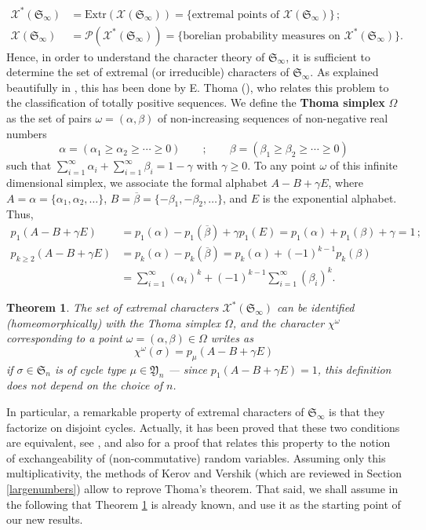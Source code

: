 \documentclass[smallextended,nospthms]{svjour3}
\newtheorem{theorem}{Theorem}
\theoremstyle{remark}
\newcommand{\sym}{\mathfrak{S}}
\newcommand{\ym}{\mathfrak{Y}}
\begin{document}
\begin{align*}\mathcal{X}^{*}(\sym_{\infty})&=\mathrm{Extr}(\mathcal{X}(\sym_{\infty}))=\{\text{extremal points of }\mathcal{X}(\sym_{\infty})\}\,;\\
\mathcal{X}(\sym_{\infty})&=\mathscr{P}(\mathcal{X}^{*}(\sym_{\infty}))=\{\text{borelian probability measures on }\mathcal{X}^{*}(\sym_{\infty})\}.
\end{align*}
Hence, in order to understand the character theory of $\sym_{\infty}$, it is sufficient to determine the set of extremal (or irreducible) characters of $\sym_{\infty}$. As explained beautifully in \cite{KOV04,Oko97}, this has been done by E. Thoma (\cite{Tho64}), who relates this problem to the classification of totally positive sequences. We define the \textbf{Thoma simplex} $\Omega$ as the set of pairs $\omega=(\alpha,\beta)$ of non-increasing sequences of non-negative real numbers
$$\alpha=(\alpha_{1}\geq \alpha_{2}\geq \cdots \geq 0)\qquad;\qquad\beta=(\beta_{1}\geq \beta_{2}\geq \cdots \geq 0)$$
such that $\sum_{i=1}^{\infty}\alpha_{i}+\sum_{i=1}^{\infty}\beta_{i}=1-\gamma$ with $\gamma \geq0$. To any point $\omega$ of this infinite dimensional simplex, we associate the formal alphabet $A-B+\gamma E$, where $A=\alpha=\{\alpha_{1},\alpha_{2},\ldots\}$, $B=\overline{\beta}=\{-\beta_{1},-\beta_{2},\ldots\}$, and $E$ is the exponential alphabet. Thus, 
\begin{align*}
p_{1}(A-B+\gamma E)&=p_{1}(\alpha)-p_{1}(\overline{\beta})+\gamma p_{1}(E)=p_{1}(\alpha)+p_{1}(\beta)+\gamma=1\,;\\
p_{k\geq 2}(A-B+\gamma E)&=p_{k}(\alpha)-p_{k}(\overline{\beta})=p_{k}(\alpha)+(-1)^{k-1}p_{k}(\beta)\\
&=\sum_{i=1}^{\infty}(\alpha_{i})^{k}+(-1)^{k-1}\sum_{i=1}^{\infty}(\beta_{i})^{k}.
\end{align*}
\begin{theorem}\label{thomatheorem}
The set of extremal characters $\mathcal{X}^{*}(\sym_{\infty})$ can be identified (homeomorphically) with the Thoma simplex $\Omega$, and the character $\chi^{\omega}$ corresponding to a point $\omega=(\alpha,\beta) \in \Omega$ writes as
$$\chi^{\omega}(\sigma)=p_{\mu}(A-B+\gamma E)$$
if $\sigma \in \sym_{n}$ is of cycle type $\mu \in \ym_{n}$ --- since $p_{1}(A-B+\gamma E)=1$, this definition does not depend on the choice of $n$.
\end{theorem}
\noindent In particular, a remarkable property of extremal characters of $\sym_{\infty}$ is that they factorize on disjoint cycles. Actually, it has been proved that these two conditions are  equivalent, see \cite{Tho64,KV84,Oko97}, and also \cite{GK10} for a proof that relates this property to the notion of exchangeability of (non-commutative) random variables. Assuming only this multiplicativity, the methods of Kerov and Vershik (which are reviewed in Section \ref{largenumbers}) allow to reprove Thoma's theorem. That said, we shall assume in the following that Theorem \ref{thomatheorem} is already known, and use it as the starting point of our new results.\bigskip
\bigskip
\end{document}
